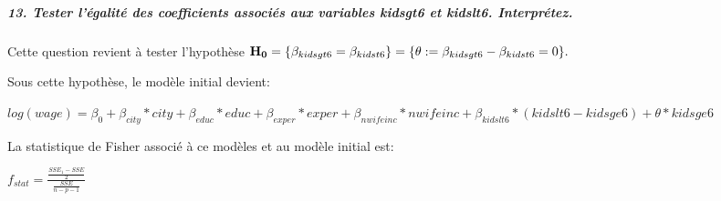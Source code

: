 \documentclass[11pt]{article}
\makeatletter
\newcommand{\boxspacing}{\kern\kvtcb@left@rule\kern\kvtcb@boxsep}
\newcommand{\prompt}[4]{
        {\ttfamily\llap{{\color{#2}[#3]:\hspace{3pt}#4}}\vspace{-\baselineskip}}
    }
\makeatother
\begin{document}
    \begin{tcolorbox}[breakable, size=fbox, boxrule=1pt, pad at break*=1mm,colback=cellbackground, colframe=cellborder]
\prompt{In}{incolor}{ }{\boxspacing}
\begin{Verbatim}[commandchars=\\\{\}]

\end{Verbatim}
\end{tcolorbox}

    \begin{tcolorbox}[breakable, size=fbox, boxrule=1pt, pad at break*=1mm,colback=cellbackground, colframe=cellborder]
\prompt{In}{incolor}{ }{\boxspacing}
\begin{Verbatim}[commandchars=\\\{\}]

\end{Verbatim}
\end{tcolorbox}

    \begin{tcolorbox}[breakable, size=fbox, boxrule=1pt, pad at break*=1mm,colback=cellbackground, colframe=cellborder]
\prompt{In}{incolor}{ }{\boxspacing}
\begin{Verbatim}[commandchars=\\\{\}]

\end{Verbatim}
\end{tcolorbox}

    \hypertarget{tester-luxe9galituxe9-des-coefficients-associuxe9s-aux-variables-kidsgt6-et-kidslt6.-interpruxe9tez.}{%
\subparagraph{13. Tester l'égalité des coefficients associés aux
variables kidsgt6 et kidslt6.
Interprétez.}\label{tester-luxe9galituxe9-des-coefficients-associuxe9s-aux-variables-kidsgt6-et-kidslt6.-interpruxe9tez.}}

    Cette question revient à tester l'hypothèse
\({\bf H_0} = \{ \beta_{kidsgt6}= \beta_{kidst6} \}=\{\theta:= \beta_{kidsgt6}- \beta_{kidst6}=0 \}.\)

Sous cette hypothèse, le modèle initial devient:

\(log(wage)= \beta_0 + \beta_{city}*city + \beta_{educ}*educ + \beta_{exper}*exper +\beta_{nwifeinc}*nwifeinc+  \beta_{kidslt6}*(kidslt6-kidsge6)+ \theta*kidsge6\)

La statistique de Fisher associé à ce modèles et au modèle initial est:

\(f_{stat} = \frac{\frac{SSE_1-SSE}{2}}{\frac{SSE}{n-p-1}}\)
\end{document}
